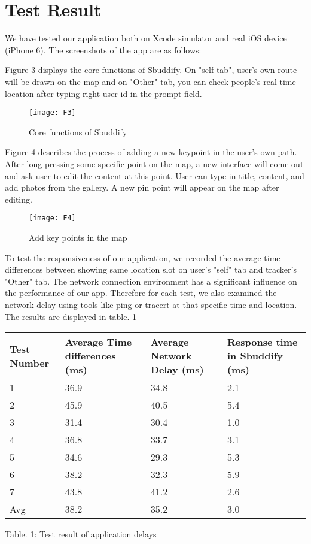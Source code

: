 \documentclass[journal]{IEEEtran}
\begin{document}
\section{Test Result}
We have tested our application both on Xcode simulator and real iOS device (iPhone 6). The screenshots of the app are as follows:	


Figure 3 displays the core functions of Sbuddify. On "self tab", user's own route will be drawn on the map and on "Other" tab, you can check people's real time location after typing right user id in the prompt field.
\begin{figure}[h]
\centering
\texttt{[image: F3]}

\caption{Core functions of Sbuddify}
\end{figure}


Figure 4 describes the process of adding a new keypoint in the user's own path. After long pressing some specific point on the map, a new interface will come out and ask user to edit the content at this point. User can type in title, content, and add photos from the gallery. A new pin point will appear on the map after editing.


\begin{figure}[h]
\centering
\texttt{[image: F4]}
\caption{Add key points in the map}
\end{figure}

To test the responsiveness of our application, we recorded the average time differences between showing same location slot on user's "self" tab and tracker's "Other" tab. The network connection environment has a significant influence on the performance of our app. Therefore for each test, we also examined the network delay using tools like ping or tracert at that specific time and location. The results are displayed in table. 1

\begin{center}
\begin{tabular}{ |m{1cm}|m{2cm}|m{2cm}|m{2.1cm}| } 
 \hline
 Test Number & Average Time differences (ms) & Average Network Delay (ms) & Response time in Sbuddify (ms) \\ 
  \hline
 1 & 36.9 & 34.8 & 2.1 \\ 
  \hline
 2 & 45.9 & 40.5 & 5.4 \\ 
   \hline
 3 & 31.4 & 30.4 & 1.0 \\ 
   \hline
 4 & 36.8 & 33.7 & 3.1 \\ 
   \hline
 5 & 34.6 & 29.3 &5.3 \\ 
   \hline
 6 & 38.2 & 32.3 & 5.9 \\ 
    \hline
 7 & 43.8 & 41.2 & 2.6 \\ 
     \hline
 Avg & 38.2 & 35.2 & 3.0 \\ 
 \hline
\end{tabular}
\end{center}
\begin{center}
Table. 1: Test result of application delays
\end{center}
\end{document}

